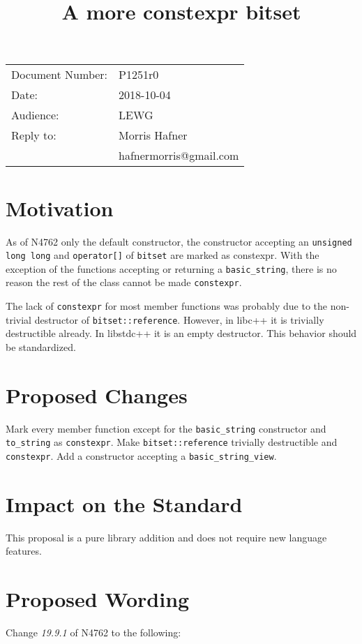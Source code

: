 \documentclass[ebook,11pt,article,a4paper]{memoir}
\title{A more constexpr bitset}
\date{}
\begin{document}
\maketitle
\hfill \begin{tabular}[t]{ll}
Document Number:& P1251r0  \\
Date:& 2018-10-04  \\
Audience: & LEWG\\
Reply to: & Morris Hafner  \\
          & hafnermorris@gmail.com  \\
\end{tabular}

\chapter{Motivation}

As of N4762 only the default constructor, the constructor accepting an \texttt{unsigned long long} and \texttt{operator[]} of \texttt{bitset} are marked as constexpr. With the exception of the functions accepting or returning a \texttt{basic\_string}, there is no reason the rest of the class cannot be made \texttt{constexpr}.

The lack of \texttt{constexpr} for most member functions was probably due to the non-trivial destructor of \texttt{bitset::reference}. However, in libc++ it is trivially destructible already. In libstdc++ it is an empty destructor. This behavior should be standardized.

\chapter{Proposed Changes}
Mark every member function except for the \texttt{basic\_string} constructor and \texttt{to\_string} as \texttt{constexpr}. Make \texttt{bitset::reference} trivially destructible and \texttt{constexpr}. Add a constructor accepting a \texttt{basic\_string\_view}.

\chapter{Impact on the Standard}
This proposal is a pure library addition and does not require new language features.

\chapter{Proposed Wording}
Change \textit{19.9.1} of N4762 to the following:
\end{document}
